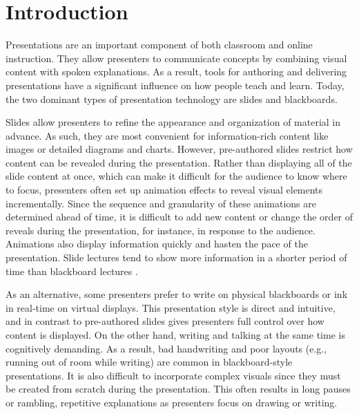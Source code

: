 \section{Introduction}

Presentations are an important component of both classroom and online instruction. 
%
They allow presenters to communicate concepts by combining visual content with spoken explanations.
%
As a result, tools for authoring and delivering presentations have a significant influence on how people teach and learn.
%
Today, the two dominant types of presentation technology are slides and blackboards.


Slides allow presenters to refine the appearance and organization of material in advance. As such, they are most convenient for information-rich content like images or detailed diagrams and charts. 
%
However, pre-authored slides restrict how content can be revealed during the presentation. Rather than displaying all of the slide content at once, which can make it difficult for the audience to know where to focus, presenters often set up animation effects to reveal visual elements incrementally. Since the sequence and granularity of these animations are determined ahead of time, it is difficult to add new content or change the order of reveals during the presentation, for instance, in response to the audience.
%
Animations also display information quickly and hasten the pace of the presentation. Slide lectures tend to show more information in a shorter period of time than blackboard lectures \cite{lanir2008observing}. 

As an alternative, some presenters prefer to write on physical blackboards or ink in real-time on virtual displays. This presentation style is direct and intuitive, and in contrast to pre-authored slides gives presenters full control over how content is displayed.
%
On the other hand, writing and talking at the same time is cognitively demanding. As a result, bad handwriting and poor layouts (e.g., running out of room while writing) are common in blackboard-style presentations. It is also difficult to incorporate complex visuals since they must be created from scratch during the presentation. This often results in long pauses or rambling, repetitive explanations as presenters focus on drawing or writing.

